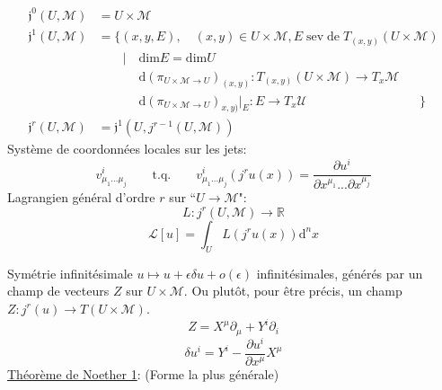 \documentclass[a4paper,11pt]{article}
\renewcommand{\d}{{\mathrm{d}}}
\newcommand{\dr}[2]{\frac{\partial {#1}}{\partial{#2}}}
\begin{document}
\begin{align*}
	\mathfrak{j}^0(U,\mathcal{M}) &= U\times\mathcal{M}\\
	\mathfrak{j}^1(U,\mathcal{M}) &= \Big\{(x,y,E), \quad (x,y)\in U\times\mathcal{M}, E \;\mathrm{sev}\;\mathrm{de}\; T_{(x,y)}(U\times\mathcal{M})\\&\quad \quad| \quad \mathrm{dim}E=\mathrm{dim}U\\
	&\quad\quad\quad\;\d (\pi_{U\times\mathcal{M}\to U})_{(x,y)}: T_{(x,y)}(U\times\mathcal{M})\to T_x\mathcal{M}
	\\&\quad\quad\quad\; \d (\pi_{U\times\mathcal{M}\to U})_{x,y)}|_E : E\to T_x\mathcal{U}\quad\quad\quad\quad\quad\quad\quad\quad\quad\Big\}\\
	\mathfrak{j}^r(U,\mathcal{M}) &= \mathfrak{j}^1(U, j^{r-1}(U,\mathcal{M}))
\end{align*}
Système de coordonnées locales sur les jets:
$$v^i_{\mu_1...\mu_j} \quad\quad \mathrm{t}.\mathrm{q}. \quad\quad v^i_{\mu_1...\mu_j}(j^ru(x))=\dr{u^i}{x^{\mu_1}...\partial x^{\mu_j}}$$
Lagrangien général d'ordre $r$ sur ``$U\to\mathcal{M}$":
$$L : j^r(U,\mathcal{M}) \to \mathbb{R}$$
$$\mathcal{L}[u] = \int_{U} L(j^r u(x))\d^n x$$

Symétrie infinitésimale $u\mapsto u+\epsilon\delta u + o(\epsilon)$ infinitésimales, générés par un champ de vecteurs $Z$ sur $U\times\mathcal{M}$. Ou plutôt, pour être précis, un champ $Z:j^r(u)\to T(U\times\mathcal{M})$.
$$Z = X^\mu \partial_\mu + Y^i  \partial_i$$
$$\delta u^i = Y^i - \dr{u^i}{x^\mu}X^\mu$$
\underline{Théorème de Noether 1}: (Forme la plus générale)
\end{document}
